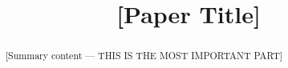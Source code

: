 \documentclass{mcmthesis}
\title{[Paper Title]}
\begin{document}
\begin{abstract}
[Summary content — THIS IS THE MOST IMPORTANT PART]
\end{abstract}
\maketitle
\tableofcontents
\newpage












\appendix

\end{document}
